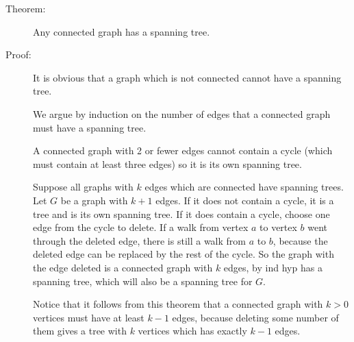 \documentclass[12pt]{article}
\begin{document}
\begin{description}
\item[Theorem:]  Any connected graph has a spanning tree.  

\item[Proof:]  It is obvious that a graph which is not connected cannot have a spanning tree.

We argue by induction on the number of edges that a connected graph must have a spanning tree.

A connected graph with 2 or fewer edges cannot contain a cycle (which must contain at least three edges)
so it is its own spanning tree.

Suppose all graphs with $k$ edges which are connected have spanning trees.  Let $G$ be a graph with $k+1$ edges.
If it does not contain a cycle, it is a tree and is its own spanning tree.  If it does contain a cycle, choose one edge from the cycle to delete.   If a walk from vertex $a$ to vertex $b$ went through the deleted edge, there is still a walk from $a$ to $b$, because the deleted edge can be replaced by the rest of the cycle.  So the graph with the edge deleted is a connected graph with $k$ edges, by ind hyp has a spanning tree, which will also be a spanning tree for $G$.

Notice that it follows from this theorem that a connected graph with $k>0$ vertices must have at least $k-1$ edges,
because deleting some number of them gives a tree with $k$ vertices which has exactly $k-1$ edges.

\end{description}
\end{document}

